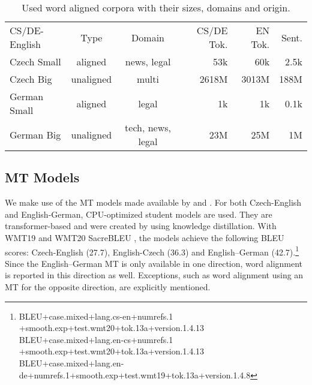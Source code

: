 \begin{table*}[h!]
    \center
    \begin{tabular}{lccrrr}
        \toprule
        CS/DE-English & Type &\hspace{-0.1cm}Domain &\hspace{-0.1cm}CS/DE Tok. & EN Tok. & Sent. \\
        \cmidrule{1-6}
        Czech Small & aligned & news, legal & 53k & 60k & 2.5k \\
        Czech Big & unaligned & multi & 2618M & 3013M & 188M \\
    German Small\hspace{-0.2cm} & aligned & legal & 1k & 1k & 0.1k \\
        German Big & unaligned &tech, news, legal & 23M & 25M & 1M \\
        \bottomrule
    \end{tabular}
    \caption{Used word aligned corpora with their sizes, domains and origin. \label{tab:corpus_used}}
\end{table*}

\subsection{MT Models}

We make use of the MT models made available by \citet{model_csen} and \citet{model_deen}. For both Czech-English and English-German, CPU-optimized student models are used. They are transformer-based \citep{vaswani2017transformer} and were created by using knowledge distillation. With WMT19 and WMT20 SacreBLEU \citep{sacrebleu}, the models achieve the following BLEU scores: Czech-English (27.7), English-Czech (36.3) and English--German (42.7).\footnote{%
BLEU+case.mixed+lang.cs-en+numrefs.1 +smooth.exp+test.wmt20+tok.13a+version.1.4.13\\
\hspace*{0.49cm}BLEU+case.mixed+lang.en-cs+numrefs.1 +smooth.exp+test.wmt20+tok.13a+version.1.4.13\\
\hspace*{0.49cm}BLEU+case.mixed+lang.en-de+numrefs.1+smooth.exp+test.wmt19+tok.13a+version.1.4.8} Since the English--German MT is only available in one direction, word alignment is reported in this direction as well. Exceptions, such as word alignment using an MT for the opposite direction, are explicitly mentioned.
